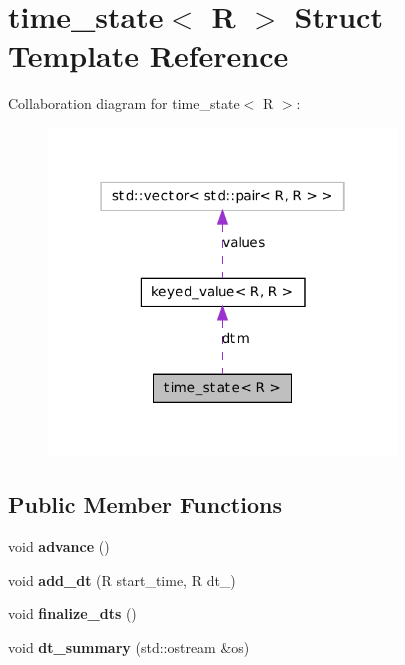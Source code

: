 \hypertarget{structtime__state}{
\section{time\_\-state$<$ R $>$ Struct Template Reference}
\label{structtime__state}
}


Collaboration diagram for time\_\-state$<$ R $>$:
\nopagebreak
\begin{figure}[H]
\begin{center}
\leavevmode
\includegraphics[width=262pt]{structtime__state__coll__graph}
\end{center}
\end{figure}
\subsection*{Public Member Functions}
\begin{DoxyCompactItemize}
\item 
\hypertarget{structtime__state_a70140623d9dde0d02302635b0848574a}{
void {\bfseries advance} ()}
\label{structtime__state_a70140623d9dde0d02302635b0848574a}

\item 
\hypertarget{structtime__state_afa54e03a4641e66c4150115137cbef65}{
void {\bfseries add\_\-dt} (R start\_\-time, R dt\_\-)}
\label{structtime__state_afa54e03a4641e66c4150115137cbef65}

\item 
\hypertarget{structtime__state_a96443b1413e21b8a8f0a4bf685d177ac}{
void {\bfseries finalize\_\-dts} ()}
\label{structtime__state_a96443b1413e21b8a8f0a4bf685d177ac}

\item 
\hypertarget{structtime__state_aeed3730c2e20e14d603781aef83f0f7e}{
void {\bfseries dt\_\-summary} (std::ostream \&os)}
\label{structtime__state_aeed3730c2e20e14d603781aef83f0f7e}

\end{DoxyCompactItemize}
